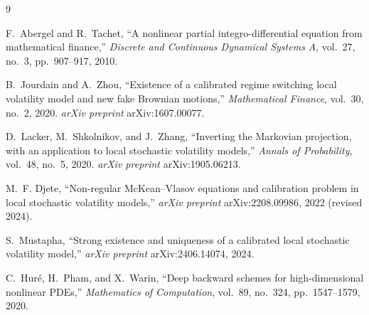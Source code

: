 \documentclass[11pt,a4paper]{article}
\theoremstyle{plain}
\theoremstyle{definition}
\theoremstyle{definition}
\begin{document}
\begin{thebibliography}{9}

 F.~Abergel and R.~Tachet, ``A nonlinear partial integro-differential equation from mathematical finance,'' \textit{Discrete and Continuous Dynamical Systems A}, vol.~27, no.~3, pp.~907--917, 2010.

 B.~Jourdain and A.~Zhou, ``Existence of a calibrated regime switching local volatility model and new fake Brownian motions,'' \textit{Mathematical Finance}, vol.~30, no.~2, 2020. \textit{arXiv preprint} arXiv:1607.00077.

 D.~Lacker, M.~Shkolnikov, and J.~Zhang, ``Inverting the Markovian projection, with an application to local stochastic volatility models,'' \textit{Annals of Probability}, vol.~48, no.~5, 2020. \textit{arXiv preprint} arXiv:1905.06213.

 M.~F. Djete, ``Non-regular McKean--Vlasov equations and calibration problem in local stochastic volatility models,'' \textit{arXiv preprint} arXiv:2208.09986, 2022 (revised 2024).

 S.~Mustapha, ``Strong existence and uniqueness of a calibrated local stochastic volatility model,'' \textit{arXiv preprint} arXiv:2406.14074, 2024.

 C.~Hur\'e, H.~Pham, and X.~Warin, ``Deep backward schemes for high-dimensional nonlinear PDEs,'' \textit{Mathematics of Computation}, vol.~89, no.~324, pp.~1547--1579, 2020.

\end{thebibliography}
\end{document}
